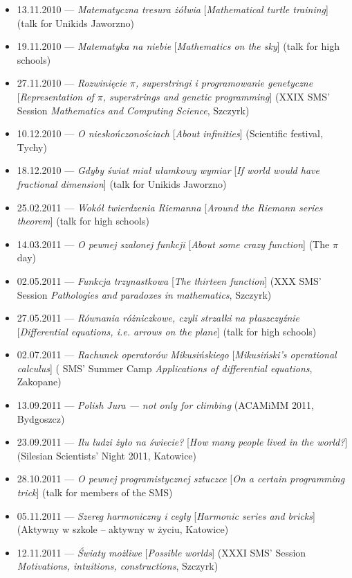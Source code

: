 \begin{itemize}
  \item 13.11.2010 --- \textsl{Matematyczna tresura żółwia} [\textsl{Mathematical turtle training}] (talk for Unikids Jaworzno)
  \item 19.11.2010 --- \textsl{Matematyka na niebie} [\textsl{Mathematics on the sky}] (talk for high schools)
  \item 27.11.2010 --- \textsl{Rozwinięcie $\pi$, superstringi i programowanie genetyczne} [\textsl{Representation of $\pi$, superstrings and genetic programming}] (XXIX SMS' Session \textsl{Mathematics and Computing Science}, Szczyrk)
  \item 10.12.2010 --- \textsl{O nieskończonościach} [\textsl{About infinities}] (Scientific festival, Tychy)
  \item 18.12.2010 --- \textsl{Gdyby świat miał ułamkowy wymiar} [\textsl{If world would have fractional dimension}] (talk for Unikids Jaworzno)
  \item 25.02.2011 --- \textsl{Wokół twierdzenia Riemanna} [\textsl{Around the Riemann series theorem}] (talk for high schools)
  \item 14.03.2011 --- \textsl{O pewnej szalonej funkcji} [\textsl{About some crazy function}] (The $\pi$ day)
  \item 02.05.2011 --- \textsl{Funkcja trzynastkowa} [\textsl{The thirteen function}] (XXX SMS' Session \textsl{Pathologies and paradoxes in mathematics}, Szczyrk)
  \item 27.05.2011 --- \textsl{Równania różniczkowe, czyli strzałki na płaszczyźnie} [\textsl{Differential equations, i.e. arrows on the plane}] (talk for high schools)
  \item 02.07.2011 --- \textsl{Rachunek operatorów Mikusińskiego} [\textsl{Mikusiński's operational calculus}] ( SMS' Summer Camp \textsl{Applications of differential equations}, Zakopane)
  \item 13.09.2011 --- \textsl{Polish Jura --- not only for climbing} (ACAMiMM 2011, Bydgoszcz)
  \item 23.09.2011 --- \textsl{Ilu ludzi żyło na świecie?} [\textsl{How many people lived in the world?}] (Silesian Scientists' Night 2011, Katowice)
  \item 28.10.2011 --- \textsl{O pewnej programistycznej sztuczce} [\textsl{On a certain programming trick}] (talk for members of the SMS)
  \item 05.11.2011 --- \textsl{Szereg harmoniczny i cegły} [\textsl{Harmonic series and bricks}] (Aktywny w szkole -- aktywny w życiu, Katowice)
  \item 12.11.2011 --- \textsl{Światy możliwe} [\textsl{Possible worlds}] (XXXI SMS' Session \textsl{Motivations, intuitions, constructions}, Szczyrk)

\end{itemize}
